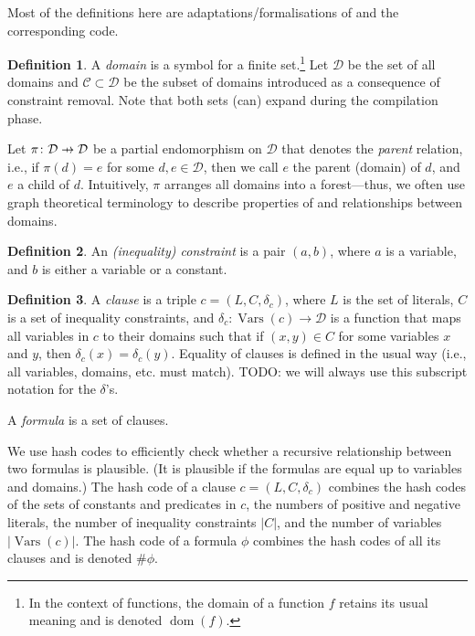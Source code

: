 \documentclass{article}
\theoremstyle{definition}
\newtheorem{definition}{Definition}
\theoremstyle{remark}
\newcommand\pfun{\mathrel{\ooalign{\hfil$\mapstochar\mkern5mu$\hfil\cr$\to$\cr}}}
\DeclareMathOperator{\dom}{dom}
\DeclareMathOperator{\Vars}{Vars}
\begin{document}
Most of the definitions here are adaptations/formalisations of \cite{DBLP:conf/ijcai/BroeckTMDR11} and the corresponding code.

\begin{definition}
  A \emph{domain} is a symbol for a finite set.\footnote{In the context of functions, the domain of a function $f$ retains its usual meaning and is denoted $\dom(f)$.} Let $\mathcal{D}$ be the set of all domains and $\mathcal{C} \subset \mathcal{D}$ be the subset of domains introduced as a consequence of constraint removal. Note that both sets (can) expand during the compilation phase.

Let $\pi\colon \mathcal{D} \pfun \mathcal{D}$ be a partial endomorphism on $\mathcal{D}$ that denotes the \emph{parent} relation, i.e., if $\pi(d) = e$ for some $d, e \in \mathcal{D}$, then we call $e$ the parent (domain) of $d$, and $e$ a child of $d$. Intuitively, $\pi$ arranges all domains into a forest---thus, we often use graph theoretical terminology to describe properties of and relationships between domains.
\end{definition}

\begin{definition}
An \emph{(inequality) constraint} is a pair $(a, b)$, where $a$ is a variable, and $b$ is either a variable or a constant.
\end{definition}

\begin{definition}
  A \emph{clause} is a triple $c = (L, C, \delta_c)$, where $L$ is the set of literals, $C$ is a set of inequality constraints, and $\delta_c\colon \Vars(c) \to \mathcal{D}$ is a function that maps all variables in $c$ to their domains such that if $(x, y) \in C$ for some variables $x$ and $y$, then $\delta_c(x) = \delta_c(y)$. Equality of clauses is defined in the usual way (i.e., all variables, domains, etc. must match). TODO: we will always use this subscript notation for the $\delta$'s. 
\end{definition}

A \emph{formula} is a set of clauses.

We use hash codes to efficiently check whether a recursive relationship between two formulas is plausible. (It is plausible if the formulas are equal up to variables and domains.) The hash code of a clause $c = (L, C, \delta_c)$ combines the hash codes of the sets of constants and predicates in $c$, the numbers of positive and negative literals, the number of inequality constraints $|C|$, and the number of variables $|\Vars(c)|$. The hash code of a formula $\phi$ combines the hash codes of all its clauses and is denoted $\#\phi$.
\end{document}
